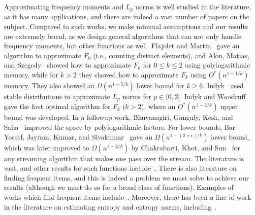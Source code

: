 \documentclass[11pt]{article}
\begin{document}
Approximating frequency moments and $L_p$ norms is
well studied in the literature, as it has many applications,
and there are indeed a vast number of papers on the subject.  Compared to such works,
we make minimal assumptions and our results are extremely broad, as we design general algorithms that can not
only handle frequency moments, but other functions as well.
Flajolet and Martin~\cite{FM85} gave an algorithm to approximate $F_0$
(i.e., counting distinct elements),
and Alon, Matias, and Szegedy~\cite{AMS96} showed how to approximate $F_k$ for
$0 \leq k \leq 2$ using polylogarithmic memory, while for $k > 2$ they showed how to approximate
$F_k$ using $O^*(n^{1-1/k})$ memory.  They also showed an $\Omega(n^{1-5/k})$ lower bound for
$k \geq 6$.  Indyk~\cite{I06} used stable distributions to approximate $L_p$ norms for
$p \in (0, 2]$.  Indyk and Woodruff~\cite{IW05} gave the first optimal algorithm
for $F_k$ ($k > 2$), where an $O^*(n^{1-2/k})$ upper bound was developed.  In a
followup work, Bhuvanagiri, Ganguly, Kesh, and Saha~\cite{BGKS06} improved the space by
polylogarithmic factors.  For lower bounds, Bar-Yossef, Jayram, Kumar, and
Sivakumar~\cite{BJKS02} gave an $\Omega(n^{1 - (2+\epsilon)/k})$ lower bound, which was
later improved to $\Omega(n^{1-2/k})$ by Chakrabarti, Khot, and Sun~\cite{CKS03} for any
streaming algorithm that makes one pass over the stream.  The literature is vast, and other
results for such functions
include~\cite{IW03,W04,BJKST02,CK04,CDIM03,FKSV99,G04,GC07,L09,KNW10Soda,KNW10Pods}.
There is also literature on finding frequent items, and this is indeed a problem we must solve
to achieve our results (although we must do so for a broad class of functions).
Examples of works which find frequent items include~\cite{CCF02,CH08,CM05ELS}.
Moreover, there has been a line of work in the literature
on estimating entropy and entropy norms, including~\cite{BG06,CBM06,CCM07,GMV06,HNO08,LSOXZ06}.
\end{document}
